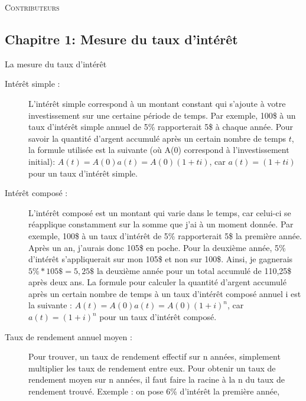 \documentclass[10pt, french]{article}
\begin{document}
\begin{center}
	\textsc{\Large Contributeurs}\\[0.5cm] 
\end{center}


\newpage

\raggedcolumns
\begin{multicols*}{3}

\section{Chapitre 1: Mesure du taux d'intérêt}
\begin{mathfinch1}{La mesure du taux d'intérêt}
\begin{description}
    \item[Intérêt simple :] L'intérêt simple correspond à un montant constant qui s'ajoute à votre investissement sur une certaine 
    période de temps. Par exemple, 100\$ à un taux d'intérêt simple annuel de 5\% rapporterait 5\$ à chaque année. 
    Pour savoir la quantité d'argent accumulé après un certain nombre de temps $t$, la formule utilisée est la suivante (où A(0) correspond à l'investissement initial): 
    $A(t) = A(0)a(t) = A(0)(1 + ti)$, car $a(t) = (1 + ti)$ pour un taux d'intérêt simple. 
\end{description}
\begin{description}
    \item[Intérêt composé :] L'intérêt composé est un montant qui varie dans le temps, car celui-ci se réapplique constamment sur la somme 
    que j'ai à un moment donnée. Par exemple, 100\$ à un taux d'intérêt de 5\% rapporterait 5\$ la première année. 
    Après un an, j'aurais donc 105\$ en poche. Pour la deuxième année, 5\% d'intérêt s'appliquerait sur mon 105\$ et non sur 100\$.
    Ainsi, je gagnerais $5\% * 105\$ = 5,25\$$ la deuxième année pour un total accumulé de 110,25\$ après deux ans. 
    La formule pour calculer la quantité d'argent accumulé après un certain nombre de temps à un taux d'intérêt composé annuel i est la suivante : 
    $A(t) = A(0)a(t) = A(0)(1 + i)^{n}$, car $a(t) =(1 + i)^{n}$ pour un taux d'intérêt composé.
\end{description}
\begin{description} %
    \item[Taux de rendement annuel moyen :] Pour trouver, un taux de rendement effectif sur n années, simplement multiplier les taux de rendement entre eux. 
    Pour obtenir un taux de rendement moyen sur n années, il faut faire la racine à la n du taux de rendement trouvé. Exemple : on pose 6\% d'intérêt la première année,

\end{description}
\end{mathfinch1}
\end{multicols*}
\end{document}
